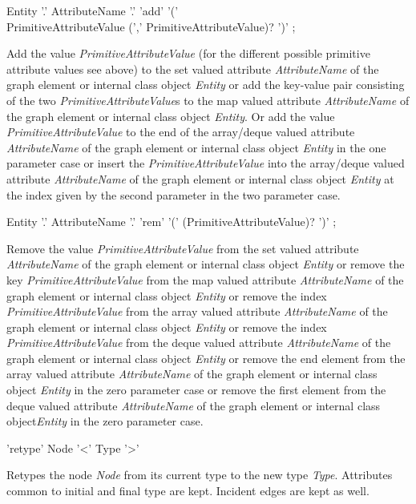 \begin{rail}
  Entity '.' AttributeName '.' 'add' '(' \\
  	PrimitiveAttributeValue (',' PrimitiveAttributeValue)? ')' ;
\end{rail}
Add the value \emph{PrimitiveAttributeValue} (for the different possible primitive attribute values see above) to the set valued attribute \emph{AttributeName} of the graph element or internal class object \emph{Entity} or add the key-value pair consisting of the two \emph{PrimitiveAttributeValue}s to the map valued attribute \emph{AttributeName} of the graph element or internal class object \emph{Entity}.
Or add the value \emph{PrimitiveAttributeValue} to the end of the array/deque valued attribute \emph{AttributeName} of the graph element or internal class object \emph{Entity} in the one parameter case or insert the \emph{PrimitiveAttributeValue} into the array/deque valued attribute \emph{AttributeName} of the graph element or internal class object \emph{Entity} at the index given by the second parameter in the two parameter case.

\begin{rail}
  Entity '.' AttributeName '.' 'rem' '(' (PrimitiveAttributeValue)? ')' ;
\end{rail}
Remove the value \emph{PrimitiveAttributeValue} from the set valued attribute \emph{AttributeName} of the graph element or internal class object \emph{Entity} or remove the key \emph{PrimitiveAttributeValue} from the map valued attribute \emph{AttributeName} of the graph element or internal class object \emph{Entity} or remove the index \emph{PrimitiveAttributeValue} from the array valued attribute \emph{AttributeName} of the graph element or internal class object \emph{Entity} or remove the index \emph{PrimitiveAttributeValue} from the deque valued attribute \emph{AttributeName} of the graph element or internal class object \emph{Entity} or remove the end element from the array valued attribute \emph{AttributeName} of the graph element or internal class object \emph{Entity} in the zero parameter case or remove the first element from the deque valued attribute \emph{AttributeName} of the graph element or internal class object\emph{Entity} in the zero parameter case.


\begin{rail}
  'retype' Node '<' Type '>'
\end{rail}
Retypes the node \emph{Node} from its current type to the new type \emph{Type}. Attributes common to initial and final type are kept. Incident edges are kept as well. 

